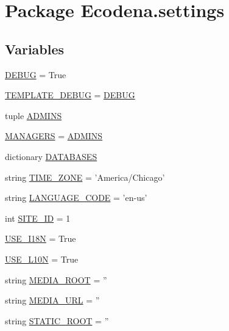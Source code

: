 \hypertarget{namespace_ecodena_1_1settings}{
\section{Package Ecodena.settings}
\label{d1/d62/namespace_ecodena_1_1settings}
}
\subsection*{Variables}
\begin{DoxyCompactItemize}
\item 
\hyperlink{namespace_ecodena_1_1settings_ac21c37d412e76b31f8d23bcbec22a154}{DEBUG} = True
\item 
\hyperlink{namespace_ecodena_1_1settings_a981025bf7ec634a2957feb5a9cce6e17}{TEMPLATE\_\-DEBUG} = \hyperlink{namespace_ecodena_1_1settings_ac21c37d412e76b31f8d23bcbec22a154}{DEBUG}
\item 
tuple \hyperlink{namespace_ecodena_1_1settings_aa5eefb4c0b5c39c9094d35a2878057b5}{ADMINS}
\item 
\hyperlink{namespace_ecodena_1_1settings_a93df833e1153a1f905d48d47bb66429f}{MANAGERS} = \hyperlink{namespace_ecodena_1_1settings_aa5eefb4c0b5c39c9094d35a2878057b5}{ADMINS}
\item 
dictionary \hyperlink{namespace_ecodena_1_1settings_afb77b339554c377a23190143df82d805}{DATABASES}
\item 
string \hyperlink{namespace_ecodena_1_1settings_ae020435689531ba9e6e4b27436829bb6}{TIME\_\-ZONE} = 'America/Chicago'
\item 
string \hyperlink{namespace_ecodena_1_1settings_a5d9f8066c3a75d690966d8a0864c973d}{LANGUAGE\_\-CODE} = 'en-\/us'
\item 
int \hyperlink{namespace_ecodena_1_1settings_ad319badaf6f23d544fa1edc45f305951}{SITE\_\-ID} = 1
\item 
\hyperlink{namespace_ecodena_1_1settings_a44976b026dbe50c63aa5d85df78a9ca3}{USE\_\-I18N} = True
\item 
\hyperlink{namespace_ecodena_1_1settings_adda63a94695b250a1b0777c8f1bfc39d}{USE\_\-L10N} = True
\item 
string \hyperlink{namespace_ecodena_1_1settings_affcc45f7cd0410fa1c0c452089c0023f}{MEDIA\_\-ROOT} = ''
\item 
string \hyperlink{namespace_ecodena_1_1settings_aa61576d13b35ee05934d15ca81f0fe14}{MEDIA\_\-URL} = ''
\item 
string \hyperlink{namespace_ecodena_1_1settings_abaf0b58735edb3e4b1637388fc556c1c}{STATIC\_\-ROOT} = ''

\end{DoxyCompactItemize}

